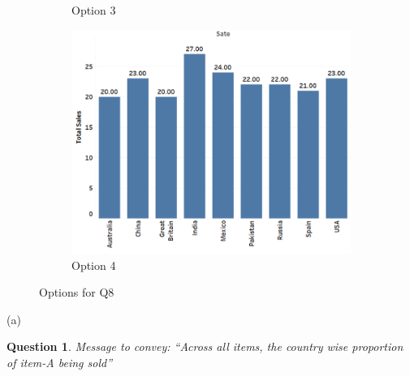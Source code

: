 \documentclass[11pt,fleqn]{book} %
\newtheorem{question}{Question}
\begin{document}
\begin{example}
\begin{figure}[hitb!]
\begin{subfigure}[c]{0.45\linewidth}
    \caption{Option 3}
    \label{fig:pa1.8-op3}
  \end{subfigure}
  \hfill
  \begin{subfigure}[c]{0.45\linewidth}
    \includegraphics[width=\linewidth]{Pictures/paq8-4.png}
    \caption{Option 4}
    \label{fig:pa1.8-op4}
  \end{subfigure}
  \caption{Options for Q8}
  \label{fig:pa1.8-op}
\end{figure}

\begin{rotanswer}
  (a)
\end{rotanswer}

\newpage

\begin{question}
Message to convey: “Across all items, the country wise proportion of item-A being sold”
\end{question}


\end{example}
\end{document}
